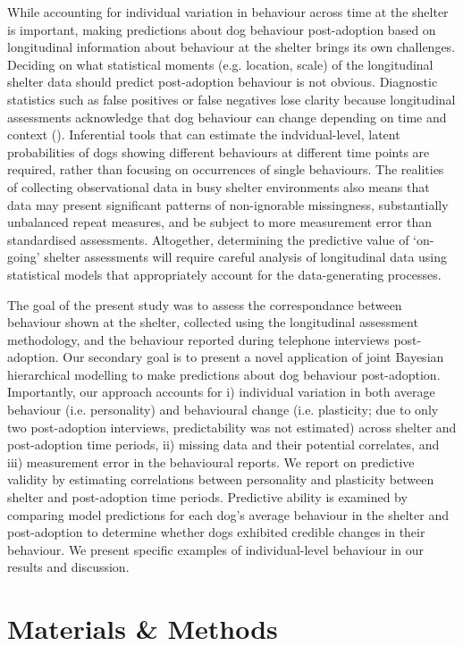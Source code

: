 \documentclass[12pt]{article}
\begin{document}
While accounting for individual variation in behaviour across time at the shelter is important, making predictions about dog behaviour post-adoption based on longitudinal information about behaviour at the shelter brings its own challenges. Deciding on what statistical moments (e.g. location, scale) of the longitudinal shelter data should predict post-adoption behaviour is not obvious. Diagnostic statistics such as false positives or false negatives lose clarity because longitudinal assessments acknowledge that dog behaviour can change depending on time and context (\cite{goold2017modelling}). Inferential tools that can estimate the indvidual-level, latent probabilities of dogs showing different behaviours at different time points are required, rather than focusing on occurrences of single behaviours. The realities of collecting observational data in busy shelter environments also means that data may present significant patterns of non-ignorable missingness, substantially unbalanced repeat measures, and be subject to more measurement error than standardised assessments. Altogether, determining the predictive value of `on-going' shelter assessments will require careful analysis of longitudinal data using statistical models that appropriately account for the data-generating processes.

The goal of the present study was to assess the correspondance between behaviour shown at the shelter, collected using the longitudinal assessment methodology, and the behaviour reported during telephone interviews post-adoption. Our secondary goal is to present a novel application of joint Bayesian hierarchical modelling to make predictions about dog behaviour post-adoption. Importantly, our approach accounts for i) individual variation in both average behaviour (i.e. personality) and behavioural change (i.e. plasticity; due to only two post-adoption interviews, predictability was not estimated) across shelter and post-adoption time periods, ii) missing data and their potential correlates, and iii) measurement error in the behavioural reports. We report on predictive validity by estimating correlations between personality and plasticity between shelter and post-adoption time periods. Predictive ability is examined by comparing model predictions for each dog's average behaviour in the shelter and post-adoption to determine whether dogs exhibited credible changes in their behaviour. We present specific examples of individual-level behaviour in our results and discussion.

\section{Materials \& Methods}
\end{document}
